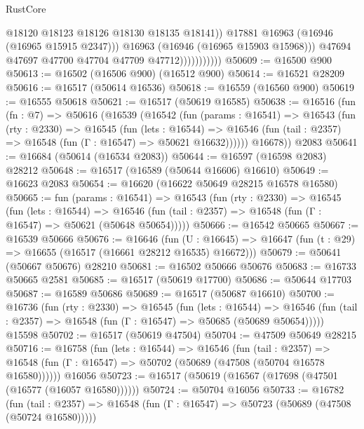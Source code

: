 \begin{lexlean}{RustCore}
\begin{coremodule}
                                  @18120
                                  @18123
                                  @18126
                                  @18130
                                  @18135
                                  @18141))
                              @17881
                              @16963
                              (@16946 (@16965 @15915 @2347)))
                            @16963
                            (@16946 (@16965 @15903 @15968)))
                          @47694
                          @47697
                          @47700
                          @47704
                          @47709
                          @47712)))))))))))
@50609 := @16500 @900
@50613 := @16502 (@16506 @900) (@16512 @900)
@50614 := @16521 @28209
@50616 := @16517 (@50614 @16536)
@50618 := @16559 (@16560 @900)
@50619 := @16555 @50618
@50621 := @16517 (@50619 @16585)
@50638 := @16516
    (fun (fn : @7) =>
    @50616
      (@16539
        (@16542
          (fun (params : @16541) =>
          @16543
            (fun (rty : @2330) =>
            @16545
              (fun (lets : @16544) =>
              @16546 (fun (tail : @2357) => @16548 (fun (Γ : @16547) => @50621 @16632))))))
        @16678))
    @2083
@50641 := @16684 (@50614 (@16534 @2083))
@50644 := @16597 (@16598 @2083) @28212
@50648 := @16517 (@16589 (@50644 @16606) @16610)
@50649 := @16623 @2083
@50654 := @16620 (@16622 @50649 @28215 @16578 @16580)
@50665 := fun (params : @16541) =>
  @16543
    (fun (rty : @2330) =>
    @16545
      (fun (lets : @16544) =>
      @16546 (fun (tail : @2357) => @16548 (fun (Γ : @16547) => @50621 (@50648 @50654)))))
@50666 := @16542 @50665
@50667 := @16539 @50666
@50676 := @16646
    (fun (U : @16645) => @16647 (fun (t : @29) => @16655 (@16517 (@16661 @28212 @16535) @16672)))
@50679 := @50641 (@50667 @50676) @28210
@50681 := @16502 @50666 @50676
@50683 := @16733 @50665 @2581
@50685 := @16517 (@50619 @17700)
@50686 := @50644 @17703
@50687 := @16589 @50686
@50689 := @16517 (@50687 @16610)
@50700 := @16736
    (fun (rty : @2330) =>
    @16545
      (fun (lets : @16544) =>
      @16546 (fun (tail : @2357) => @16548 (fun (Γ : @16547) => @50685 (@50689 @50654)))))
    @15598
@50702 := @16517 (@50619 @47504)
@50704 := @47509 @50649 @28215
@50716 := @16758
    (fun (lets : @16544) =>
    @16546
      (fun (tail : @2357) =>
      @16548 (fun (Γ : @16547) => @50702 (@50689 (@47508 (@50704 @16578 @16580))))))
    @16056
@50723 := @16517 (@50619 (@16567 (@17698 (@47501 (@16577 (@16057 @16580))))))
@50724 := @50704 @16056
@50733 := @16782
    (fun (tail : @2357) => @16548 (fun (Γ : @16547) => @50723 (@50689 (@47508 (@50724 @16580)))))

\end{coremodule}
\end{lexlean}
